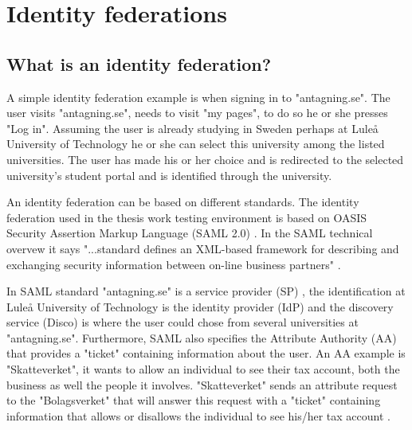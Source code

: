 \section{Identity federations}
\subsection{What is an identity federation?}
A simple identity federation example is when signing in to "antagning.se". 
The user visits "antagning.se", needs to visit "my pages", to do so he or she presses "Log in". 
Assuming the user is already studying in Sweden perhaps at Lule\r{a} University of Technology he or 
she can select this university among the listed universities. 
The user has made his or her choice and is redirected to the selected university's student portal and is identified through the university. 

An identity federation can be based on different standards.
The identity federation used in the thesis work testing environment is based on OASIS Security Assertion Markup Language (SAML 2.0) \cite{pdf:oasis-open-core,pdf:oasis-open-metadata,pdf:oasis-open-metadata-profile,pdf:oasis-open-bindings,pdf:oasis-open-profiles,pdf:oasis-open-glossary,pdf:oasis-open}. 
In the SAML technical overvew it says "...standard defines an XML-based framework for describing and exchanging security information 
between on-line business partners"
\cite[p.~8]{pdf:oasis-open}.    

In SAML standard "antagning.se" is a service provider (SP) \cite[p.~11]{pdf:oasis-open-glossary}, the identification at Lule\r{a} University 
of Technology is the identity provider (IdP) \cite[p.~7]{pdf:oasis-open-glossary} and the discovery service (Disco) is where the user could 
chose from several universities at "antagning.se".
Furthermore, SAML also specifies the Attribute Authority (AA) that provides 
a "ticket" containing information about the user. An AA example is "Skatteverket", it wants to 
allow an individual to see their tax account, both the business as well the people it involves. 
"Skatteverket" sends an attribute request to the "Bolagsverket" that will answer this request 
with a "ticket" containing information that allows or disallows the individual to see his/her tax account \cite[p.~284]{pdf:SOU}.


